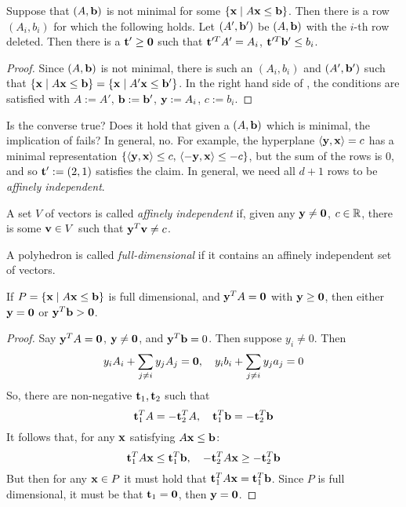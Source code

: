 \begin{Prop}\label{ab_not_minimal}
	Suppose that $(A,\mathbf{b})$ is not minimal for some $\left\{\mathbf{x}\;|\; A\mathbf{x}\leq \mathbf{b}\right\}$.  Then there is a row $(A_i,b_i)$ for which the following holds.  Let $(A',\mathbf{b}')$ be $(A,\mathbf{b})$ with the $i$-th row deleted.  Then there is a $\mathbf{t}'\geq\mathbf{0}$ such that $\mathbf{t}'^T A' = A_i$, $\mathbf{t}'^T \mathbf{b}' \leq b_i$.
\end{Prop}

\begin{proof}
	Since $(A,\mathbf{b})$ is not minimal, there is such an $(A_i,b_i)$ and $(A',\mathbf{b}')$ such that $\left\{\mathbf{x}\;|\; A\mathbf{x}\leq \mathbf{b}\right\} = \left\{\mathbf{x}\;|\; A'\mathbf{x}\leq \mathbf{b}'\right\}$.  In the right hand side of , the conditions are satisfied with $A := A'$, $\mathbf{b} := \mathbf{b}'$, $\mathbf{y} := A_i$, $c := b_i$.
\end{proof}

Is the converse true?  Does it hold that given a $(A,\mathbf{b})$ which is minimal, the implication of  fails?  In general, no.  For example, the hyperplane $\left\langle \mathbf{y}, \mathbf{x} \right\rangle = c$ has a minimal representation $\left\{\left\langle \mathbf{y}, \mathbf{x} \right\rangle\leq c,\,\left\langle -\mathbf{y}, \mathbf{x} \right\rangle\leq -c\right\}$, but the sum of the rows is $0$, and so $\mathbf{t}':= (2,1)$ satisfies the claim.  In general, we need all $d+1$ rows to be \textit{affinely independent}.

\begin{Def}
	A set $V$ of vectors is called \textit{affinely independent} if, given any $\mathbf{y}\neq\mathbf{0}$, $c\in\mathbb{R}$, there is some $\mathbf{v}\in V$ such that $\mathbf{y}^T\mathbf{v} \neq c$.
\end{Def}

\begin{Def}
	A polyhedron is called \textit{full-dimensional} if it contains an affinely independent set of vectors.
\end{Def}

\drawNotFullDim

\begin{Prop}\label{ab_full_dim}
	If $P = \left\{\mathbf{x}\;|\; A\mathbf{x}\leq \mathbf{b}\right\}$ is full dimensional, and $\mathbf{y}^T A = \mathbf{0}$ with $\mathbf{y}\geq\mathbf{0}$, then either $\mathbf{y} = \mathbf{0}$ or $\mathbf{y}^T \mathbf{b} > \mathbf{0}$.
\end{Prop}

\begin{proof}
	Say $\mathbf{y}^T A = \mathbf{0}$, $\mathbf{y} \neq \mathbf{0}$, and $\mathbf{y}^T\mathbf{b} = 0$.  Then suppose $y_i \neq 0$.  Then
	\[y_i A_i + \sum_{j\neq i}y_j A_j = \mathbf{0},\quad y_i b_i + \sum_{j\neq i} y_j a_j = 0 \]
	So, there are non-negative $\mathbf{t}_1,\mathbf{t}_2$ such that
	\[\mathbf{t}_1^T A = -\mathbf{t}_2^T A,\quad \mathbf{t}_1^T\mathbf{b} = -\mathbf{t}_2^T\mathbf{b}\]
	It follows that, for any $\mathbf{x}$ satisfying $A\mathbf{x}\leq\mathbf{b}$:
  \[ \mathbf{t}_1^T A\mathbf{x} \leq \mathbf{t}_1^T \mathbf{b},\quad -\mathbf{t}_2^T A\mathbf{x} \geq -\mathbf{t}_2^T \mathbf{b} \]
  But then for any $\mathbf{x}\in P$ it must hold that $\mathbf{t}_1^T A \mathbf{x} = \mathbf{t}_1^T \mathbf{b}$.  Since $P$ is full dimensional, it must be that $\mathbf{t}_1 = \mathbf{0}$, then $\mathbf{y} = \mathbf{0}$.
\end{proof}

